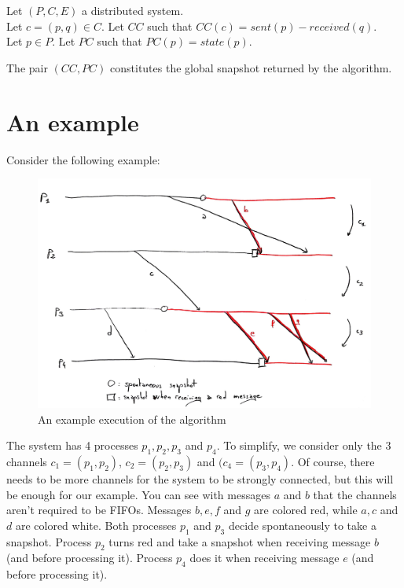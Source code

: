 \documentclass{article}
\begin{document}
Let $(P,C,E)$ a distributed system.\\
Let $c=(p,q)\in C$. Let $CC$ such that $CC(c) = \mathit{sent}(p) - \mathit{received}(q)$.\\
Let $p\in P$. Let $PC$ such that $PC(p)=\mathit{state}(p)$.

The pair $(CC,PC)$ constitutes the global snapshot returned by the algorithm.

\section{An example}

Consider the following example:
\begin{figure}[!h]
  \centering
  \includegraphics[scale=0.15]{example.jpg}
  \caption{An example execution of the algorithm}
\end{figure}

The system has 4 processes $p_1,p_2,p_3$ and $p_4$.
To simplify, we consider only the 3 channels $c_1=(p_1,p_2)$, $c_2=(p_2,p_3)$ and $(c_4=(p_3,p_4)$.
Of course, there needs to be more channels for the system to be strongly connected, but this will be enough for our example.
You can see with messages $a$ and $b$ that the channels aren't required to be FIFOs.
Messages $b,e,f$ and $g$ are colored red, while $a,c$ and $d$ are colored white.
Both processes $p_1$ and $p_3$ decide spontaneously to take a snapshot.
Process $p_2$ turns red and take a snapshot when receiving message $b$ (and before processing it).
Process $p_4$ does it when receiving message $e$ (and before processing it).
\end{document}
